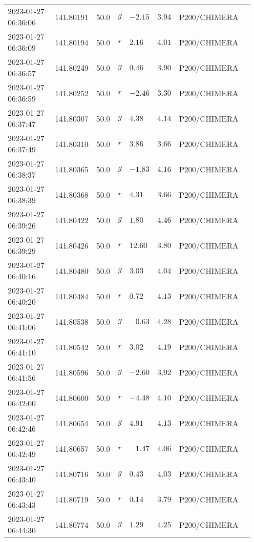 \documentclass{nature_plusfigure}
\begin{document}
\begin{supplement}
\begin{center}
\begin{longtable}{llllllll}
2023-01-27 06:36:06 & 141.80191 & 50.0 & $g$ & $-2.15$ & $3.94$ & P200/CHIMERA &  \\ 
2023-01-27 06:36:09 & 141.80194 & 50.0 & $r$ & $2.16$ & $4.01$ & P200/CHIMERA &  \\ 
2023-01-27 06:36:57 & 141.80249 & 50.0 & $g$ & $0.46$ & $3.90$ & P200/CHIMERA &  \\ 
2023-01-27 06:36:59 & 141.80252 & 50.0 & $r$ & $-2.46$ & $3.30$ & P200/CHIMERA &  \\ 
2023-01-27 06:37:47 & 141.80307 & 50.0 & $g$ & $4.38$ & $4.14$ & P200/CHIMERA &  \\ 
2023-01-27 06:37:49 & 141.80310 & 50.0 & $r$ & $3.86$ & $3.66$ & P200/CHIMERA &  \\ 
2023-01-27 06:38:37 & 141.80365 & 50.0 & $g$ & $-1.83$ & $4.16$ & P200/CHIMERA &  \\ 
2023-01-27 06:38:39 & 141.80368 & 50.0 & $r$ & $4.31$ & $3.66$ & P200/CHIMERA &  \\ 
2023-01-27 06:39:26 & 141.80422 & 50.0 & $g$ & $1.80$ & $4.46$ & P200/CHIMERA &  \\ 
2023-01-27 06:39:29 & 141.80426 & 50.0 & $r$ & $12.60$ & $3.80$ & P200/CHIMERA &  \\ 
2023-01-27 06:40:16 & 141.80480 & 50.0 & $g$ & $3.03$ & $4.04$ & P200/CHIMERA &  \\ 
2023-01-27 06:40:20 & 141.80484 & 50.0 & $r$ & $0.72$ & $4.13$ & P200/CHIMERA &  \\ 
2023-01-27 06:41:06 & 141.80538 & 50.0 & $g$ & $-0.63$ & $4.28$ & P200/CHIMERA &  \\ 
2023-01-27 06:41:10 & 141.80542 & 50.0 & $r$ & $3.02$ & $4.19$ & P200/CHIMERA &  \\ 
2023-01-27 06:41:56 & 141.80596 & 50.0 & $g$ & $-2.60$ & $3.92$ & P200/CHIMERA &  \\ 
2023-01-27 06:42:00 & 141.80600 & 50.0 & $r$ & $-4.48$ & $4.10$ & P200/CHIMERA &  \\ 
2023-01-27 06:42:46 & 141.80654 & 50.0 & $g$ & $4.91$ & $4.13$ & P200/CHIMERA &  \\ 
2023-01-27 06:42:49 & 141.80657 & 50.0 & $r$ & $-1.47$ & $4.06$ & P200/CHIMERA &  \\ 
2023-01-27 06:43:40 & 141.80716 & 50.0 & $g$ & $0.43$ & $4.03$ & P200/CHIMERA &  \\ 
2023-01-27 06:43:43 & 141.80719 & 50.0 & $r$ & $0.14$ & $3.79$ & P200/CHIMERA &  \\ 
2023-01-27 06:44:30 & 141.80774 & 50.0 & $g$ & $1.29$ & $4.25$ & P200/CHIMERA &  \\ 

\end{longtable}
\end{center}
\end{supplement}
\end{document}
